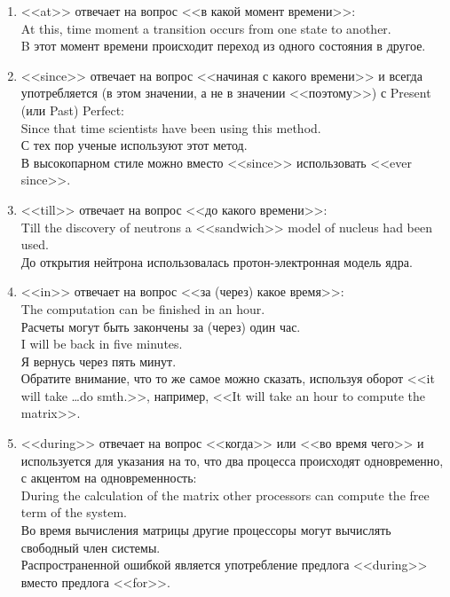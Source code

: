 \documentclass[a5paper, 10pt, twoside, numbers=enddot]{scrartcl}
\begin{document}
\begin{enumerate}
\begin{enumerate}
    \item <<at>> отвечает на вопрос <<в какой момент времени>>:\\ [4pt]
    \textsf{At this, time moment a transition occurs from one state to another.\\
    B этот момент времени происходит переход из одного состояния в другое.}

    \item <<since>> отвечает на вопрос <<начиная с какого времени>> и всегда употребляется (в этом значении, а не в значении <<поэтому>>) с Present (или Past) Perfect:\\ [4pt]
    \textsf{Since that time scientists have been using this method.\\
    С тех пор ученые используют этот метод.\\ [4pt]}
    В высокопарном стиле можно вместо <<since>> использовать <<ever since>>.

    \item <<till>> отвечает на вопрос <<до какого времени>>:\\ [4pt]
    \textsf{Till the discovery of neutrons a <<sandwich>> model of nucleus had been used.\\
    До открытия нейтрона использовалась протон-электронная модель ядра.}

    \item <<in>> отвечает на вопрос <<за (через) какое время>>:\\ [4pt]
    \textsf{The computation can be finished in an hour.\\
    Расчеты могут быть закончены за (через) один час.\\ [4pt]
    I will  be back in five minutes.\\
    Я вернусь через пять минут.\\ [4pt]}
    Обратите внимание, что то же самое можно сказать, используя оборот <<it will take \ldots do smth.>>, например, <<It will take an hour to compute the matrix>>.

    \item <<during>> отвечает на вопрос <<когда>> или <<во время чего>> и используется для указания на то, что два процесса происходят одновременно, с акцентом на одновременность:\\ [4pt]
    \textsf{During the calculation of the matrix other processors can compute the free term of the system.\\
    Во время вычисления матрицы другие  процессоры могут вычислять свободный член системы.\\ [4pt]}
    Распространенной ошибкой является употребление предлога <<during>> вместо предлога <<for>>.


\end{enumerate}
\end{enumerate}
\end{document}
